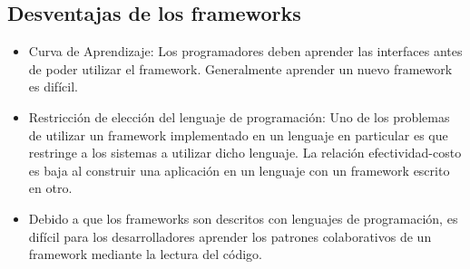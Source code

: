 \subsection {Desventajas de los frameworks}
\begin{itemize}
    \item Curva de Aprendizaje: Los programadores deben aprender las interfaces
    antes de poder utilizar el framework. Generalmente aprender un nuevo
    framework es difícil.
    
    \item Restricción de elección del lenguaje de programación: Uno de los
    problemas de utilizar un framework implementado en un lenguaje en particular
    es que restringe a los sistemas a utilizar dicho lenguaje. La relación
    efectividad-costo es baja al construir una aplicación en un lenguaje con un
    framework escrito en otro.
    
    \item Debido a que los frameworks son descritos con lenguajes de
    programación, es difícil para los desarrolladores aprender los patrones
    colaborativos de un framework mediante la lectura del código.
    
\end{itemize}

